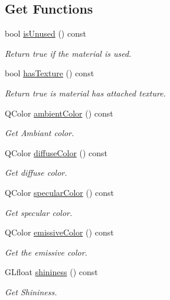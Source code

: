 \subsection*{Get Functions}
\begin{DoxyCompactItemize}
\item 
bool \hyperlink{class_g_l_c___material_a154e584bf0c517a5d91ad966c5fd9e78}{is\-Unused} () const 
\begin{DoxyCompactList}\small\item\em Return true if the material is used. \end{DoxyCompactList}\item 
bool \hyperlink{class_g_l_c___material_a47c78602dbdeab0b0a101f49face3c7a}{has\-Texture} () const 
\begin{DoxyCompactList}\small\item\em Return true is material has attached texture. \end{DoxyCompactList}\item 
Q\-Color \hyperlink{class_g_l_c___material_a33d042e846e6bbd4abb4d38f859c9f58}{ambient\-Color} () const 
\begin{DoxyCompactList}\small\item\em Get Ambiant color. \end{DoxyCompactList}\item 
Q\-Color \hyperlink{class_g_l_c___material_a3d6924655bf86145e451ba03b40d04c2}{diffuse\-Color} () const 
\begin{DoxyCompactList}\small\item\em Get diffuse color. \end{DoxyCompactList}\item 
Q\-Color \hyperlink{class_g_l_c___material_a72586c9558073c34fd538dc8efda7e6e}{specular\-Color} () const 
\begin{DoxyCompactList}\small\item\em Get specular color. \end{DoxyCompactList}\item 
Q\-Color \hyperlink{class_g_l_c___material_ad85ca437af098afe9061305bb25135d8}{emissive\-Color} () const 
\begin{DoxyCompactList}\small\item\em Get the emissive color. \end{DoxyCompactList}\item 
G\-Lfloat \hyperlink{class_g_l_c___material_a15fcdc2d11960cac10b64ab860a0e545}{shininess} () const 
\begin{DoxyCompactList}\small\item\em Get Shininess. \end{DoxyCompactList}\item 

\end{DoxyCompactItemize}
